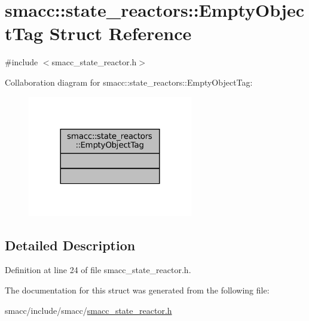 \hypertarget{structsmacc_1_1state__reactors_1_1EmptyObjectTag}{}\section{smacc\+:\+:state\+\_\+reactors\+:\+:Empty\+Object\+Tag Struct Reference}
\label{structsmacc_1_1state__reactors_1_1EmptyObjectTag}


{\ttfamily \#include $<$smacc\+\_\+state\+\_\+reactor.\+h$>$}



Collaboration diagram for smacc\+:\+:state\+\_\+reactors\+:\+:Empty\+Object\+Tag\+:
\nopagebreak
\begin{figure}[H]
\begin{center}
\leavevmode
\includegraphics[width=204pt]{structsmacc_1_1state__reactors_1_1EmptyObjectTag__coll__graph}
\end{center}
\end{figure}


\subsection{Detailed Description}


Definition at line 24 of file smacc\+\_\+state\+\_\+reactor.\+h.



The documentation for this struct was generated from the following file\+:\begin{DoxyCompactItemize}
\item 
smacc/include/smacc/\hyperlink{smacc__state__reactor_8h}{smacc\+\_\+state\+\_\+reactor.\+h}\end{DoxyCompactItemize}
